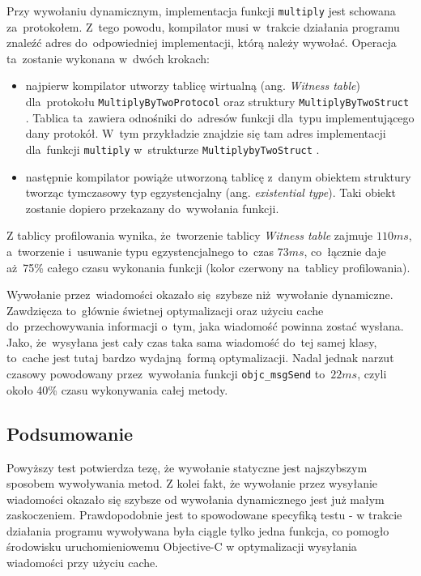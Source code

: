 \documentclass[mgr, shortabstract]{iithesis}
\newcommand{\ang}[1]{ang. \textit{#1}}
\newcommand{\swiftinline}[1]{
    \texttt{#1}
}
\newcommand{\objcinline}[1]{
    \texttt{#1}
}
\begin{document}
Przy wywołaniu dynamicznym, implementacja funkcji \swiftinline{multiply} jest schowana za~protokołem. Z~tego powodu, kompilator musi w~trakcie działania programu znaleźć adres do~odpowiedniej implementacji, którą należy wywołać. Operacja ta~zostanie wykonana w~dwóch krokach:

\begin{itemize}
    \item najpierw kompilator utworzy tablicę wirtualną (\ang{Witness table}) dla~protokołu \swiftinline{MultiplyByTwoProtocol} oraz struktury \swiftinline{MultiplyByTwoStruct}. Tablica ta~zawiera odnośniki do~adresów funkcji dla~typu implementującego dany protokół. W~tym przykładzie znajdzie się tam adres implementacji dla~funkcji \swiftinline{multiply} w~strukturze \swiftinline{MultiplybyTwoStruct}.
    \item następnie kompilator powiąże utworzoną tablicę z~danym obiektem struktury tworząc tymczasowy typ egzystencjalny (\ang{existential type}). Taki obiekt zostanie dopiero przekazany do~wywołania funkcji.
\end{itemize}

Z tablicy profilowania wynika, że~tworzenie tablicy \textit{Witness table} zajmuje $110ms$, a~tworzenie i~usuwanie typu egzystencjalnego to~czas $73ms$, co~łącznie daje aż~75\% całego czasu wykonania funkcji (kolor czerwony na~tablicy profilowania).

Wywołanie przez~wiadomości okazało się szybsze niż wywołanie dynamiczne. Zawdzięcza to~głównie świetnej optymalizacji oraz użyciu cache do~przechowywania informacji o~tym, jaka wiadomość powinna zostać wysłana. Jako, że~wysyłana jest cały czas taka sama wiadomość do~tej samej klasy, to~cache jest tutaj bardzo wydajną formą optymalizacji. Nadal jednak narzut czasowy powodowany przez~wywołania funkcji \objcinline{objc_msgSend} to~$22ms$, czyli około 40\% czasu wykonywania całej metody.

\subsection{Podsumowanie}

Powyższy test potwierdza tezę, że wywołanie statyczne jest najszybszym sposobem wywoływania metod. Z kolei fakt, że wywołanie przez wysyłanie wiadomości okazało się szybsze od wywołania dynamicznego jest już małym zaskoczeniem. Prawdopodobnie jest to spowodowane specyfiką testu - w trakcie działania programu wywoływana była ciągle tylko jedna funkcja, co pomogło środowisku uruchomieniowemu Objective-C w optymalizacji wysyłania wiadomości przy użyciu cache.
\end{document}
